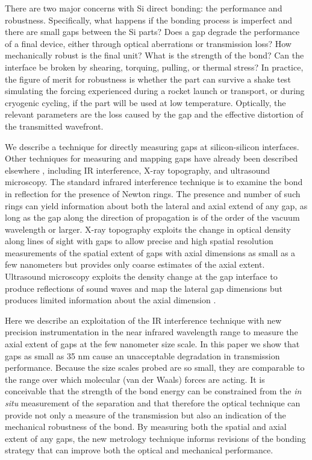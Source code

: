 \documentclass[osajnl,preprint,showpacs,superscriptaddress,12pt]{revtex4-1} %
\begin{document}
There are two major concerns with Si direct bonding: the performance and robustness.  Specifically, what happens if the bonding process is imperfect and there are small gaps between the Si parts?  Does a gap degrade the performance of a final device, either through optical aberrations or transmission loss?  How mechanically robust is the final unit?  What is the strength of the bond?  Can the interface be broken by shearing, torquing, pulling, or thermal stress?  In practice, the figure of merit for robustness is whether the part can survive a shake test simulating the forcing experienced during a rocket launch or transport, or during cryogenic cycling, if the part will be used at low temperature.  Optically, the relevant parameters are the loss caused by the gap and the effective distortion of the transmitted wavefront.


We describe a technique for directly measuring gaps at silicon-silicon interfaces.  Other techniques for measuring and mapping gaps have already been described elsewhere \cite{1992JEMat..21..669M}, including IR interference, X-ray topography, and ultrasound microscopy.  The standard infrared interference technique is to examine the bond in reflection for the presence of Newton rings.  The presence and number of such rings can yield information about both the lateral and axial extend of any gap, as long as the gap along the direction of propagation is of the order of the vacuum wavelength or larger.  X-ray topography \cite{1992JEMat..21..669M,1994JaJAP..33....6H} exploits the change in optical density along lines of sight with gaps to allow precise and high spatial resolution measurements of the spatial extent of gaps with axial dimensions as small as a few nanometers but provides only coarse estimates of the axial extent.  Ultrasound microscopy exploits the density change at the gap interface to produce reflections of sound waves and map the lateral gap dimensions but produces limited information about the axial dimension \cite{2000RScI...71.1869G}.


Here we describe an exploitation of the IR interference technique with new precision instrumentation in the near infrared wavelength range to measure the axial extent of gaps at the few nanometer size scale.  In this paper we show that gaps as small as 35 nm cause an unacceptable degradation in transmission performance.  Because the size scales probed are so small, they are comparable to the range over which molecular (van der Waals) forces are acting.  It is conceivable that the strength of the bond energy can be constrained from the \emph{in situ} measurement of the separation and that therefore the optical technique can provide not only a measure of the transmission but also an indication of the mechanical robustness of the bond.  By measuring both the spatial and axial extent of any gaps, the new metrology technique informs revisions of the bonding strategy that can improve both the optical and mechanical performance.  
\end{document}
